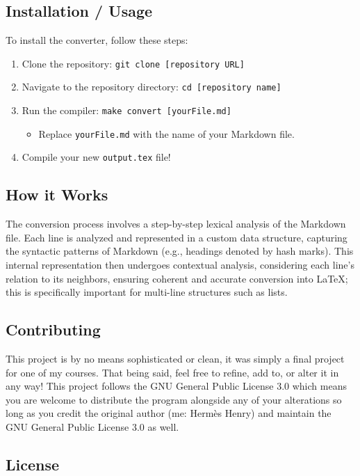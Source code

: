 \documentclass{article}
\begin{document}
\subsection{Installation / Usage}

To install the converter, follow these steps:

\begin{enumerate}
    \item Clone the repository: \texttt{git clone [repository URL]}
    \item Navigate to the repository directory: \texttt{cd [repository name]}
    \item Run the compiler: \texttt{make convert [yourFile.md]}
\begin{itemize}
    \item  Replace \texttt{yourFile.md} with the name of your Markdown file.
\end{itemize}
    \item Compile your new \texttt{output.tex} file!
\end{enumerate}


\subsection{How it Works}

The conversion process involves a step-by-step lexical analysis of the Markdown file. Each line is analyzed and represented in a custom data structure, capturing the syntactic patterns of Markdown (e.g., headings denoted by hash marks). This internal representation then undergoes contextual analysis, considering each line’s relation to its neighbors, ensuring coherent and accurate conversion into LaTeX; this is specifically important for multi-line structures such as lists.


\subsection{Contributing}

This project is by no means sophisticated or clean, it was simply a final project for one of my courses. That being said, feel free to refine, add to, or alter it in any way! This project follows the GNU General Public License 3.0 which means you are welcome to distribute the program alongside any of your alterations so long as you credit the original author (me: Hermès Henry) and maintain the GNU General Public License 3.0 as well.


\subsection{License}
\end{document}
